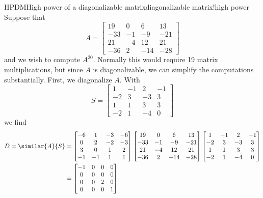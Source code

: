 \begin{example}{HPDM}{High power of a diagonalizable matrix}{diagonalizable matrix!high power}
%
Suppose that
%
\begin{equation*}
A=\begin{bmatrix}
 19 & 0 & 6 & 13 \\
 -33 & -1 & -9 & -21 \\
 21 & -4 & 12 & 21 \\
 -36 & 2 & -14 & -28
\end{bmatrix}
\end{equation*}
%
and we wish to compute $A^{20}$.  Normally this would require 19 matrix multiplications, but since $A$ is diagonalizable, we can simplify the computations substantially.  First, we diagonalize $A$.  With
%
\begin{equation*}
S=\begin{bmatrix}
 1 & -1 & 2 & -1 \\
 -2 & 3 & -3 & 3 \\
 1 & 1 & 3 & 3 \\
 -2 & 1 & -4 & 0
\end{bmatrix}
\end{equation*}
%
we find
%
%
\begin{align*}
%
D=\similar{A}{S}
&=
\begin{bmatrix}
 -6 & 1 & -3 & -6 \\
 0 & 2 & -2 & -3 \\
 3 & 0 & 1 & 2 \\
 -1 & -1 & 1 & 1
\end{bmatrix}
\begin{bmatrix}
 19 & 0 & 6 & 13 \\
 -33 & -1 & -9 & -21 \\
 21 & -4 & 12 & 21 \\
 -36 & 2 & -14 & -28
\end{bmatrix}
\begin{bmatrix}
 1 & -1 & 2 & -1 \\
 -2 & 3 & -3 & 3 \\
 1 & 1 & 3 & 3 \\
 -2 & 1 & -4 & 0
\end{bmatrix}\\
%
&=
\begin{bmatrix}
 -1 & 0 & 0 & 0 \\
 0 & 0 & 0 & 0 \\
 0 & 0 & 2 & 0 \\
 0 & 0 & 0 & 1
\end{bmatrix}
%
\end{align*}

\end{example}
